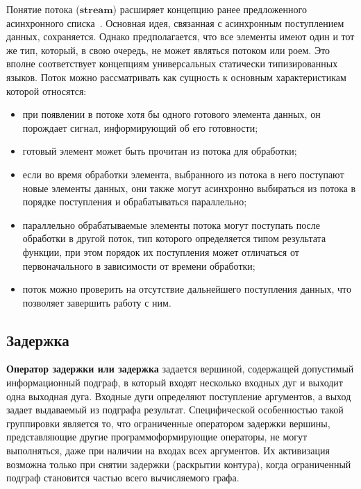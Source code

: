 Понятие потока ($\mathbf{stream}$) расширяет концепцию ранее предложенного асинхронного списка~\cite{asynch}. Основная идея, связанная с асинхронным поступлением данных, сохраняется. Однако предполагается, что все элементы имеют один и тот же тип, который, в свою очередь, не может являться потоком или роем. Это вполне соответствует концепциям универсальных статически типизированных языков. Поток можно рассматривать как сущность к основным характеристикам которой относятся:
\begin{itemize}
	\item при появлении в потоке хотя бы одного готового элемента данных, он порождает сигнал, информирующий об его готовности;
	\item готовый элемент может быть прочитан из потока для обработки;
	\item если во время обработки элемента, выбранного из потока в него поступают новые элементы данных, они также могут асинхронно выбираться из потока в порядке поступления и обрабатываться параллельно;
	\item параллельно обрабатываемые элементы потока могут поступать после обработки в другой поток, тип которого определяется типом результата функции, при этом порядок их поступления	может отличаться от первоначального в зависимости от времени обработки;
	\item поток можно проверить на отсутствие дальнейшего поступления данных, что позволяет завершить работу с ним.
\end{itemize}


\subsection{Задержка}

\textbf{Оператор задержки или задержка} задается вершиной, содержащей допустимый информационный подграф, в который входят несколько входных дуг и выходит одна выходная дуга. Входные дуги определяют поступление аргументов, а выход задает выдаваемый из подграфа результат. Специфической особенностью такой группировки является то, что ограниченные оператором задержки вершины, представляющие другие программоформирующие операторы, не могут выполняться, даже при наличии на входах всех аргументов. Их активизация возможна только при снятии задержки (раскрытии контура), когда ограниченный подграф становится частью всего вычисляемого графа.

